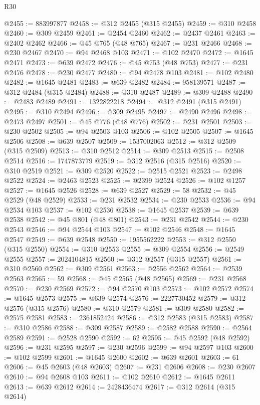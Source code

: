 \begin{lexlean}{R30}
\begin{coremodule}
@2455 := 883997877
@2458 := @312 @2455 (@315 @2455)
@2459 := @310 @2458
@2460 := @309 @2459
@2461 := @2454 @2460
@2462 := @2437 @2461
@2463 := @2402 @2462
@2466 := @45 @765 (@48 @765)
@2467 := @231 @2466
@2468 := @230 @2467
@2470 := @94 @2468 @103
@2471 := @102 @2470
@2472 := @1645 @2471
@2473 := @639 @2472
@2476 := @45 @753 (@48 @753)
@2477 := @231 @2476
@2478 := @230 @2477
@2480 := @94 @2478 @103
@2481 := @102 @2480
@2482 := @1645 @2481
@2483 := @639 @2482
@2484 := 958139571
@2487 := @312 @2484 (@315 @2484)
@2488 := @310 @2487
@2489 := @309 @2488
@2490 := @2483 @2489
@2491 := 1322822218
@2494 := @312 @2491 (@315 @2491)
@2495 := @310 @2494
@2496 := @309 @2495
@2497 := @2490 @2496
@2498 := @2473 @2497
@2501 := @45 @776 (@48 @776)
@2502 := @231 @2501
@2503 := @230 @2502
@2505 := @94 @2503 @103
@2506 := @102 @2505
@2507 := @1645 @2506
@2508 := @639 @2507
@2509 := 1537002063
@2512 := @312 @2509 (@315 @2509)
@2513 := @310 @2512
@2514 := @309 @2513
@2515 := @2508 @2514
@2516 := 1747873779
@2519 := @312 @2516 (@315 @2516)
@2520 := @310 @2519
@2521 := @309 @2520
@2522 := @2515 @2521
@2523 := @2498 @2522
@2524 := @2463 @2523
@2525 := @2399 @2524
@2526 := @102 @1257
@2527 := @1645 @2526
@2528 := @639 @2527
@2529 := 58
@2532 := @45 @2529 (@48 @2529)
@2533 := @231 @2532
@2534 := @230 @2533
@2536 := @94 @2534 @103
@2537 := @102 @2536
@2538 := @1645 @2537
@2539 := @639 @2538
@2542 := @45 @801 (@48 @801)
@2543 := @231 @2542
@2544 := @230 @2543
@2546 := @94 @2544 @103
@2547 := @102 @2546
@2548 := @1645 @2547
@2549 := @639 @2548
@2550 := 1955562222
@2553 := @312 @2550 (@315 @2550)
@2554 := @310 @2553
@2555 := @309 @2554
@2556 := @2549 @2555
@2557 := 2024104815
@2560 := @312 @2557 (@315 @2557)
@2561 := @310 @2560
@2562 := @309 @2561
@2563 := @2556 @2562
@2564 := @2539 @2563
@2565 := 59
@2568 := @45 @2565 (@48 @2565)
@2569 := @231 @2568
@2570 := @230 @2569
@2572 := @94 @2570 @103
@2573 := @102 @2572
@2574 := @1645 @2573
@2575 := @639 @2574
@2576 := 2227730452
@2579 := @312 @2576 (@315 @2576)
@2580 := @310 @2579
@2581 := @309 @2580
@2582 := @2575 @2581
@2583 := 2361852424
@2586 := @312 @2583 (@315 @2583)
@2587 := @310 @2586
@2588 := @309 @2587
@2589 := @2582 @2588
@2590 := @2564 @2589
@2591 := @2528 @2590
@2592 := 62
@2595 := @45 @2592 (@48 @2592)
@2596 := @231 @2595
@2597 := @230 @2596
@2599 := @94 @2597 @103
@2600 := @102 @2599
@2601 := @1645 @2600
@2602 := @639 @2601
@2603 := 61
@2606 := @45 @2603 (@48 @2603)
@2607 := @231 @2606
@2608 := @230 @2607
@2610 := @94 @2608 @103
@2611 := @102 @2610
@2612 := @1645 @2611
@2613 := @639 @2612
@2614 := 2428436474
@2617 := @312 @2614 (@315 @2614)

\end{coremodule}
\end{lexlean}
